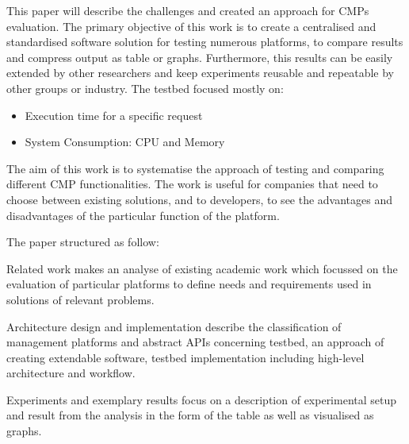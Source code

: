 This paper will describe the challenges and created an approach for CMPs evaluation. The primary objective of this work is to create a centralised and standardised software solution for testing numerous platforms, to compare results and compress output as table or graphs. Furthermore, this results can be easily extended by other researchers and keep experiments reusable and repeatable by other groups or industry. The testbed focused mostly on: 
\begin{itemize}
\item Execution time for a specific request
\item System Consumption: CPU and Memory
\end{itemize}

The aim of this work is to systematise the approach of testing and comparing different CMP functionalities. The work is useful for companies that need to choose between existing solutions, and to developers, to see the advantages and disadvantages of the particular function of the platform. 

The paper structured as follow: 

Related work makes an analyse of existing academic work which focussed on the evaluation of particular platforms to define needs and requirements used in solutions of relevant problems.

Architecture design and implementation describe the classification of management platforms and abstract APIs concerning testbed, an approach of creating extendable software, testbed implementation including high-level architecture and workflow.

Experiments and exemplary results focus on a description of experimental setup and result from the analysis in the form of the table as well as visualised as graphs. 
